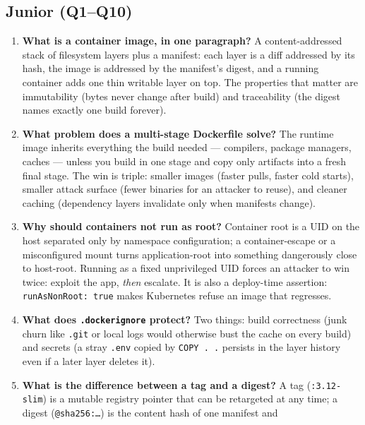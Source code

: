 \subsection*{Junior (Q1--Q10)}
\begin{enumerate}[label=\textbf{Q\arabic*.}, leftmargin=1.6cm]
  \item \textbf{What is a container image, in one paragraph?}
        A content-addressed stack of filesystem layers plus a manifest:
        each layer is a diff addressed by its hash, the image is
        addressed by the manifest's digest, and a running container adds
        one thin writable layer on top. The properties that matter are
        immutability (bytes never change after build) and traceability
        (the digest names exactly one build forever).
  \item \textbf{What problem does a multi-stage Dockerfile solve?}
        The runtime image inherits everything the build needed ---
        compilers, package managers, caches --- unless you build in one
        stage and copy only artifacts into a fresh final stage. The win
        is triple: smaller images (faster pulls, faster cold starts),
        smaller attack surface (fewer binaries for an attacker to reuse),
        and cleaner caching (dependency layers invalidate only when
        manifests change).
  \item \textbf{Why should containers not run as root?}
        Container root is a UID on the host separated only by namespace
        configuration; a container-escape or a misconfigured mount turns
        application-root into something dangerously close to host-root.
        Running as a fixed unprivileged UID forces an attacker to win
        twice: exploit the app, \emph{then} escalate. It is also a
        deploy-time assertion: \texttt{runAsNonRoot: true} makes
        Kubernetes refuse an image that regresses.
  \item \textbf{What does \texttt{.dockerignore} protect?}
        Two things: build correctness (junk churn like \texttt{.git} or
        local logs would otherwise bust the cache on every build) and
        secrets (a stray \texttt{.env} copied by \texttt{COPY . .}
        persists in the layer history even if a later layer deletes it).
  \item \textbf{What is the difference between a tag and a digest?}
        A tag (\texttt{:3.12-slim}) is a mutable registry pointer that
        can be retargeted at any time; a digest
        (\texttt{@sha256:\ldots}) is the content hash of one manifest and

\end{enumerate}
